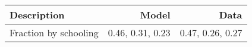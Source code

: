 \begin{tabular}{lrr}
\hline
Description & Model  & Data  \\
\hline
Fraction by schooling & 0.46, 0.31, 0.23  & 0.47, 0.26, 0.27  \\
\hline
\end{tabular}%
